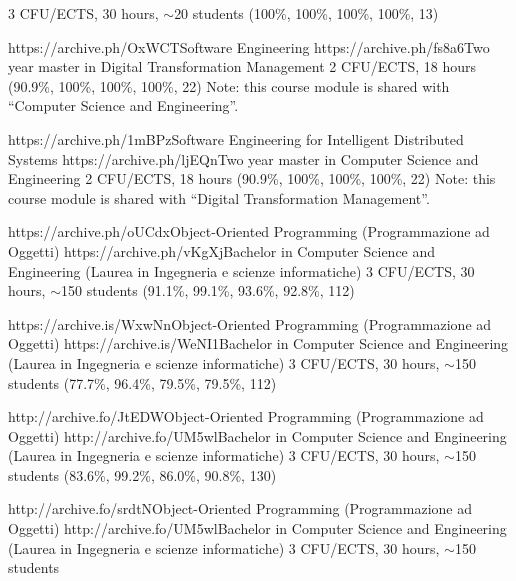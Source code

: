 \begin{outerlist}
        {3 CFU/ECTS, 30 hours, $\sim$20 students}
        {(100\%, 100\%, 100\%, 100\%, 13)}
        {\oopjava}
    \item[2021/22]
        \unibocourse %
        {https://archive.ph/OxWCT}{Software Engineering}
        {https://archive.ph/fs8a6}{Two year master in Digital Transformation Management}
        {2 CFU/ECTS, 18 hours}
        {(90.9\%, 100\%, 100\%, 100\%, 22)}
        {
            \sedtmeit{}
            Note: this course module is shared with ``Computer Science and Engineering''.
        }
    \item[2021/22]
        \unibocourse %
        {https://archive.ph/1mBPz}{Software Engineering for Intelligent Distributed Systems}
        {https://archive.ph/ljEQn}{Two year master in Computer Science and Engineering}
        {2 CFU/ECTS, 18 hours}
        {(90.9\%, 100\%, 100\%, 100\%, 22)}
        {
            \sedtmeit{}
            Note: this course module is shared with ``Digital Transformation Management''.
        }
    \item[2021/22]
        \unibocourse
        {https://archive.ph/oUCdx}{Object-Oriented Programming (Programmazione ad Oggetti)}
        {https://archive.ph/vKgXj}{Bachelor in Computer Science and Engineering (Laurea in Ingegneria e scienze informatiche)}
        {3 CFU/ECTS, 30 hours, $\sim${}150 students}
        {(91.1\%, 99.1\%, 93.6\%, 92.8\%, 112)}
        {\oopjava}
    \item[2020/21]
        \unibocourse
        {https://archive.is/WxwNn}{Object-Oriented Programming (Programmazione ad Oggetti)}
        {https://archive.is/WeNI1}{Bachelor in Computer Science and Engineering (Laurea in Ingegneria e scienze informatiche)}
        {3 CFU/ECTS, 30 hours, $\sim$150 students}
        {(77.7\%, 96.4\%, 79.5\%, 79.5\%, 112)}
        {\oopjava}
    \item[2019/20]
        \unibocourse
        {http://archive.fo/JtEDW}{Object-Oriented Programming (Programmazione ad Oggetti)}
        {http://archive.fo/UM5wl}{Bachelor in Computer Science and Engineering (Laurea in Ingegneria e scienze informatiche)}
        {3 CFU/ECTS, 30 hours, $\sim$150 students}
        {(83.6\%, 99.2\%, 86.0\%, 90.8\%, 130)}
        {\oopjava}
    \item[2018/19]
        \unibocourse
        {http://archive.fo/srdtN}{Object-Oriented Programming (Programmazione ad Oggetti)}
        {http://archive.fo/UM5wl}{Bachelor in Computer Science and Engineering (Laurea in Ingegneria e scienze informatiche)}
        {3 CFU/ECTS, 30 hours, $\sim$150 students}

\end{outerlist}
